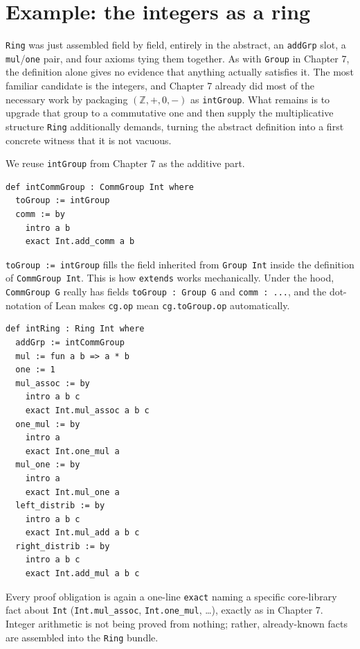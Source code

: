 \section{Example: the integers as a ring}\label{sec:09-rings:04-integers-example:1}

\texttt{Ring} was just assembled field by field, entirely in the abstract, an \texttt{addGrp} slot, a \texttt{mul}/\texttt{one} pair, and four axioms tying them together. As with \texttt{Group} in Chapter 7, the definition alone gives no evidence that anything actually satisfies it. The most familiar candidate is the integers, and Chapter 7 already did most of the necessary work by packaging \((\mathbb{Z}, +, 0, -)\) as \texttt{intGroup}. What remains is to upgrade that group to a commutative one and then supply the multiplicative structure \texttt{Ring} additionally demands, turning the abstract definition into a first concrete witness that it is not vacuous.

We reuse \texttt{intGroup} from Chapter 7 as the additive part.

\begin{lstlisting}
def intCommGroup : CommGroup Int where
  toGroup := intGroup
  comm := by
    intro a b
    exact Int.add_comm a b
\end{lstlisting}

\texttt{toGroup := intGroup} fills the field inherited from \texttt{Group Int} inside the definition of \texttt{CommGroup Int}. This is how \texttt{extends} works mechanically. Under the hood, \texttt{CommGroup G} really has fields \texttt{toGroup : Group G} and \texttt{comm : ...}, and the dot-notation of Lean makes \texttt{cg.op} mean \texttt{cg.toGroup.op} automatically.

\begin{lstlisting}
def intRing : Ring Int where
  addGrp := intCommGroup
  mul := fun a b => a * b
  one := 1
  mul_assoc := by
    intro a b c
    exact Int.mul_assoc a b c
  one_mul := by
    intro a
    exact Int.one_mul a
  mul_one := by
    intro a
    exact Int.mul_one a
  left_distrib := by
    intro a b c
    exact Int.mul_add a b c
  right_distrib := by
    intro a b c
    exact Int.add_mul a b c
\end{lstlisting}

Every proof obligation is again a one-line \texttt{exact} naming a specific core-library fact about \texttt{Int} (\texttt{Int.mul\_\allowbreak{}assoc}, \texttt{Int.one\_\allowbreak{}mul}, \ldots), exactly as in Chapter 7. Integer arithmetic is not being proved from nothing; rather, already-known facts are assembled into the \texttt{Ring} bundle.

